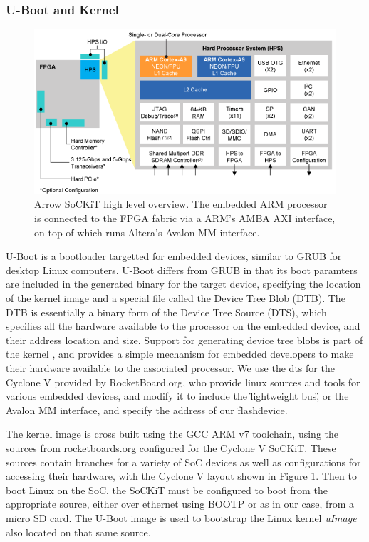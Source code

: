 \documentclass{sig-alternate-10pt}
\begin{document}
\subsubsection{U-Boot and Kernel}
\begin{figure}
	\begin{center}
		\includegraphics[width=0.9\linewidth]{fig/soc_cyclonev.png}
		\caption{
			Arrow SoCKiT high level overview. The embedded ARM processor is connected to the FPGA fabric via a ARM's AMBA AXI interface, on top of which runs Altera's Avalon MM interface.
		}
		\label{fig:cyclone_diag}
	\end{center}
\end{figure}

U-Boot is a bootloader targetted for embedded devices, similar to GRUB for desktop Linux computers. U-Boot differs from GRUB in that its boot paramters are included in the generated binary for the target device, specifying the location of the kernel image and a special file called the Device Tree Blob (DTB). The DTB is essentially a binary form of the Device Tree Source (DTS), which specifies all the hardware available to the processor on the embedded device, and their address location and size. Support for generating device tree blobs is part of the kernel \cite{dts_linux}, and provides a simple mechanism for embedded developers to make their hardware available to the associated processor. We use the dts for the Cyclone V provided by RocketBoard.org, who provide linux sources and tools for various embedded devices, and modify it to include the \"lightweight bus\", or the Avalon MM interface, and specify the address of our \"flash\" device.

The kernel image is cross built using the GCC ARM v7 toolchain, using the sources from rocketboards.org configured for the Cyclone V SoCKiT. These sources contain branches for a variety of SoC devices as well as configurations for accessing their hardware, with the Cyclone V layout shown in Figure \ref{fig:cyclone_diag}. Then to boot Linux on the SoC, the SoCKiT must be configured to boot from the appropriate source, either over ethernet using BOOTP or as in our case, from a micro SD card. The U-Boot image is used to bootstrap the Linux kernel \emph{uImage} also located on that same source. 
\end{document}
